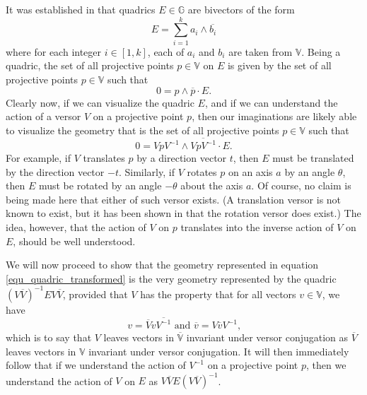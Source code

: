 \documentclass{birkjour}
\theoremstyle{definition}
\theoremstyle{remark}
\numberwithin{equation}{section}
\newcommand{\G}{\mathbb{G}}
\newcommand{\V}{\mathbb{V}}
\begin{document}
It was established in \cite{Parkin12} that quadrics $E\in\G$ are bivectors
of the form
\begin{equation}\label{equ_quadric_form}
E = \sum_{i=1}^k a_i\wedge\overline{b_i}
\end{equation}
where for each integer $i\in[1,k]$, each of $a_i$ and $b_i$ are
taken from $\V$.  Being a quadric, the set of all projective points
$p\in\V$ on $E$ is given by the set of all projective points $p\in\V$
such that
\begin{equation}\label{equ_quadric_representation}
0 = p\wedge\overline{p}\cdot E.
\end{equation}
Clearly now, if we can visualize the quadric $E$, and if we can understand the action
of a versor $V$ on a projective point $p$, then our imaginations are likely able
to visualize the geometry that is the set of all projective points $p\in\V$ such that
\begin{equation}\label{equ_quadric_transformed}
0 = VpV^{-1}\wedge\overline{VpV^{-1}}\cdot E.
\end{equation}
For example, if $V$ translates $p$ by a direction vector $t$, then $E$ must be
translated by the direction vector $-t$.  Similarly, if $V$ rotates $p$ on
an axis $a$ by an angle $\theta$, then $E$ must be rotated by an
angle $-\theta$ about the axis $a$.  Of course, no
claim is being made here that either of such versor exists.  (A translation
versor is not known to exist, but it has been shown in \cite{Parkin12} that the
rotation versor does exist.)  The idea, however,
that the action of $V$ on $p$ translates into the inverse
action of $V$ on $E$, should be well understood.

We will now proceed to show that the geometry represented in
equation \eqref{equ_quadric_transformed} is the very geometry
represented by the quadric $(V\overline{V})^{-1}EV\overline{V}$,
provided that $V$ has the property that for all vectors $v\in\V$,
we have
\begin{equation}\label{equ_versor_invariant_property}
\mbox{$v=\overline{V}v\overline{V^{-1}}$ and $\overline{v}=V\overline{v}V^{-1}$,}
\end{equation}
which is to say that $V$ leaves vectors in $\overline{\V}$ invariant under versor
conjugation as $\overline{V}$ leaves vectors in $\V$ invariant under versor conjugation.
It will then immediately follow
that if we understand the action of $V^{-1}$ on a projective point $p$, then
we understand the action of $V$ on $E$ as $V\overline{V}E(V\overline{V})^{-1}$.
\end{document}
